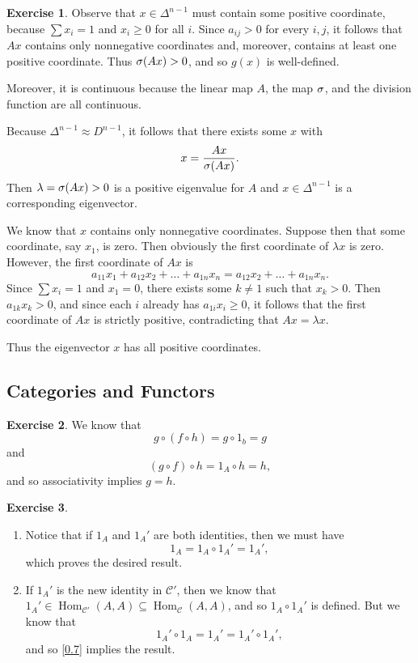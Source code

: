 \documentclass[10pt]{article}
\theoremstyle{definition}
\newtheorem{intex}{Exercise}[section]
\newenvironment{exercise}{\begin{intex}\label{\theintex}}{\end{intex}}
\DeclareMathOperator\Hom{Hom}
\begin{document}
\begin{exercise} \leavevmode
Observe that $x\in\Delta^{n-1}$ must contain some positive coordinate, because $\sum x_i=1$ and $x_i\ge0$ for all $i$. Since $a_{ij}>0$ for every $i,j$, it follows that $Ax$ contains only nonnegative coordinates and, moreover, contains at least one positive coordinate. Thus $\sigma(Ax)>0$, and so $g(x)$ is well-defined. 

Moreover, it is continuous because the linear map $A$, the map $\sigma$, and the division function are all continuous. 

Because $\Delta^{n-1}\approx D^{n-1}$, it follows that there exists some $x$ with \[x=\frac{Ax}{\sigma(Ax)}.\] Then $\lambda=\sigma(Ax)>0$ is a positive eigenvalue for $A$ and $x\in\Delta^{n-1}$ is a corresponding eigenvector. 

We know that $x$ contains only nonnegative coordinates. Suppose then that some coordinate, say $x_1$, is zero. Then obviously the first coordinate of $\lambda x$ is zero. However, the first coordinate of $Ax$ is \[a_{11}x_1+a_{12}x_2+\dots+a_{1n}x_n=a_{12}x_2+\dots+a_{1n}x_n.\] Since $\sum x_i=1$ and $x_1=0$, there exists some $k\ne1$ such that $x_k>0$. Then $a_{1k}x_k>0$, and since each $i$ already has $a_{1i}x_i\ge0$, it follows that the first coordinate of $Ax$ is strictly positive, contradicting that $Ax=\lambda x$. 

Thus the eigenvector $x$ has all positive coordinates. 
\end{exercise} 

\subsection{Categories and Functors} 
\begin{exercise} \leavevmode
We know that \[g\circ(f\circ h)=g\circ1_b=g\] and \[(g\circ f)\circ h=1_A\circ h=h,\] and so associativity implies $g=h$. 
\end{exercise} 

\begin{exercise} \leavevmode 
\begin{enumerate} 
\item Notice that if $1_A$ and $1_A'$ are both identities, then we must have \[1_A=1_A\circ 1_A'=1_A',\] which proves the desired result. 

\item If $1_A'$ is the new identity in $\mathcal C'$, then we know that $1_A'\in\Hom_{\mathcal C'}(A,A)\subseteq\Hom_{\mathcal C}(A,A)$, and so $1_A\circ 1_A'$ is defined. But we know that \[1_A'\circ1_A=1_A'=1_A'\circ1_A',\] and so \cref{0.7} implies the result. 
\end{enumerate} 
\end{exercise} 
\end{document}

